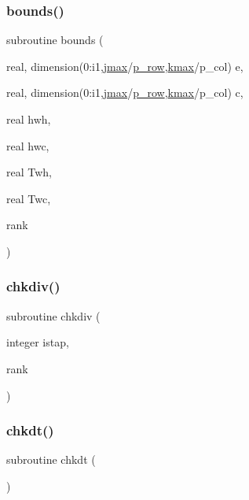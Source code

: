 \mbox{\label{main__comp_8f_a6df9a9b6373074b5f5ef9ef372c765ee}} 
\subsubsection{\texorpdfstring{bounds()}{bounds()}}
{\footnotesize\ttfamily subroutine bounds (\begin{DoxyParamCaption}\item[{real, dimension(0\+:i1,\hyperlink{param_8h_ac5c80d846ec0c4cf1c91fc5d9d66faa1}{jmax}/\hyperlink{param_8h_a149afb59990224def797b29467985bac}{p\+\_\+row},\hyperlink{param_8h_ae0453dd20a7c6a923904df942ef82468}{kmax}/p\+\_\+col)}]{e,  }\item[{real, dimension(0\+:i1,\hyperlink{param_8h_ac5c80d846ec0c4cf1c91fc5d9d66faa1}{jmax}/\hyperlink{param_8h_a149afb59990224def797b29467985bac}{p\+\_\+row},\hyperlink{param_8h_ae0453dd20a7c6a923904df942ef82468}{kmax}/p\+\_\+col)}]{c,  }\item[{real}]{hwh,  }\item[{real}]{hwc,  }\item[{real}]{Twh,  }\item[{real}]{Twc,  }\item[{}]{rank }\end{DoxyParamCaption})}

\mbox{\label{main__comp_8f_a5440cdfb3b8587b1fb03ab3fc6d1c90a}} 
\subsubsection{\texorpdfstring{chkdiv()}{chkdiv()}}
{\footnotesize\ttfamily subroutine chkdiv (\begin{DoxyParamCaption}\item[{integer}]{istap,  }\item[{}]{rank }\end{DoxyParamCaption})}

\mbox{\label{main__comp_8f_af09e0eab6b8b50ecfee67d75d1eb2e51}} 
\subsubsection{\texorpdfstring{chkdt()}{chkdt()}}
{\footnotesize\ttfamily subroutine chkdt (\begin{DoxyParamCaption}{ }\end{DoxyParamCaption})}

